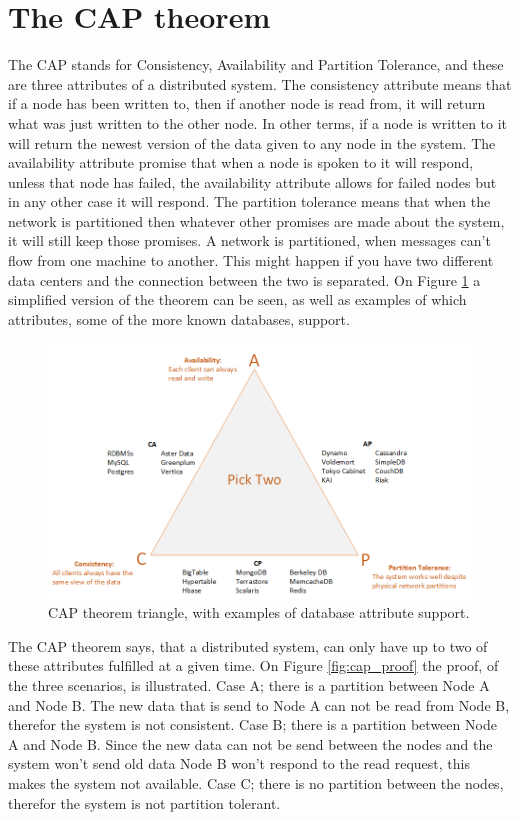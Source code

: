 \section{The CAP theorem}
The CAP stands for Consistency, Availability and Partition Tolerance, and these are three attributes of a distributed system. The consistency attribute means that if a node has been written to, then if another node is read from, it will return what was just written to the other node. In other terms, if a node is written to it will return the newest version of the data given to any node in the system. The availability attribute promise that when a node is spoken to it will respond, unless that node has failed, the availability attribute allows for failed nodes but in any other case it will respond. The partition tolerance means that when the network is partitioned then whatever other promises are made about the system, it will still keep those promises. A network is partitioned, when messages can't flow from one machine to another. This might happen if you have two different data centers and the connection between the two is separated. On Figure \ref{fig:cap_triangle} a simplified version of the theorem can be seen, as well as examples of which attributes, some  of the more known databases, support.

\begin{figure}[h!]
	\centering
	\includegraphics[width=0.61\linewidth]{consistency/fig/cap_triangle.png}
	\caption{CAP theorem triangle, with examples of database attribute support.}
	\label{fig:cap_triangle}
\end{figure}

The CAP theorem says, that a distributed system, can only have up to two of these attributes fulfilled at a given time. On Figure \ref{fig:cap_proof} the proof, of the three scenarios, is illustrated. Case A; there is a partition between Node A and Node B. The new data that is send to Node A can not be read from Node B, therefor the system is not consistent. Case B; there is a partition between Node A and Node B. Since the new data can not be send between the nodes and the system won't send old data Node B won't respond to the read request, this makes the system not available. Case C; there is no partition between the nodes, therefor the system is not partition tolerant.

